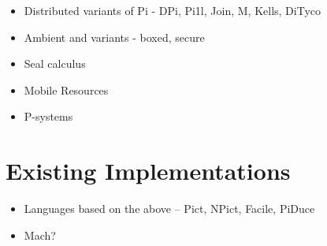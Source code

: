 \begin{itemize}
\item Distributed variants of Pi - DPi, Pi1l, Join, M, Kells, DiTyco
\item Ambient and variants - boxed, secure
\item Seal calculus
\item Mobile Resources
\item P-systems
\end{itemize}

\section{Existing Implementations}

\begin{itemize}
\item Languages based on the above -- Pict, NPict, Facile, PiDuce
\item Mach?
\end{itemize}

